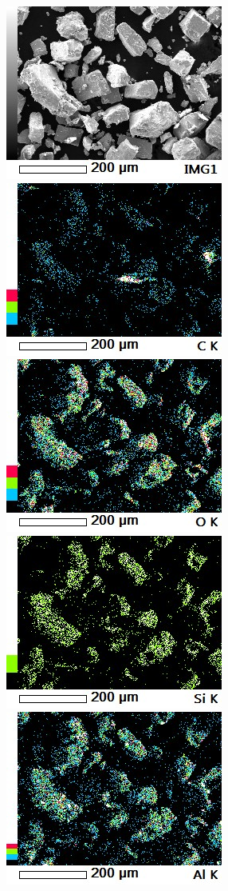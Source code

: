 \documentclass[12pt]{article}
\begin{document}
\begin{figure}[H]
	\includegraphics[width = 0.45\linewidth]{./pictures/map1_IMG1.jpg} \hspace{1em}%
	\includegraphics[width = 0.45\linewidth]{./pictures/map1_C_K.jpg} \hspace{1em}%
	\includegraphics[width = 0.45\linewidth]{./pictures/map1_O_K.jpg} \hspace{1em}%
	\includegraphics[width = 0.45\linewidth]{./pictures/map1_Si_K.jpg} \hspace{1em}%
	\includegraphics[width = 0.45\linewidth]{./pictures/map1_Al_K.jpg}\hspace{4.2em}%

\end{figure}
\end{document}
